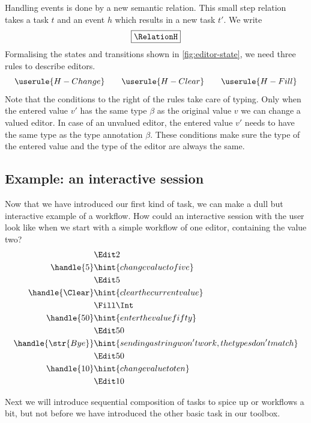 Handling events is done by a new semantic relation.
This small step relation takes a task $t$ and an event $h$ which results in a new task $t'$.
We write
\begin{equation*}
  \boxed{\RelationH}
\end{equation*}
Formalising the states and transitions shown in \autoref{fig:editor-state},
we need three rules to describe editors.
\begin{equation*}
  \userule{H-Change} \qquad \userule{H-Clear} \qquad \userule{H-Fill}
\end{equation*}
Note that the conditions to the right of the rules take care of typing.
Only when the entered value $v'$ has the same type $\beta$ as the original value $v$ we can change a valued editor.
In case of an unvalued editor,
the entered value $v'$ needs to have the same type as the type annotation $\beta$.
These conditions make sure the type of the entered value and the type of the editor are always the same.


\subsection{Example: an interactive session}

Now that we have introduced our first kind of task,
we can make a dull but interactive example of a workflow.
How could an interactive session with the user look like when we start with a simple workflow of one editor,
containing the value two?
\begin{align*}
    & \Edit 2 \\
  \handle{5} & \hint{change value to five} \\
    & \Edit 5 \\
  \handle{\Clear} & \hint{clear the current value} \\
    & \Fill \Int \\
  \handle{50} & \hint{enter the value fifty} \\
    & \Edit 50 \\
  \handle{\str{Bye}} & \hint{sending a string won't work, the types don't match} \\
    & \Edit 50 \\
  \handle{10} & \hint{change value to ten} \\
    & \Edit 10
\end{align*}

Next we will introduce sequential composition of tasks to spice up or workflows a bit,
but not before we have introduced the other basic task in our toolbox.
